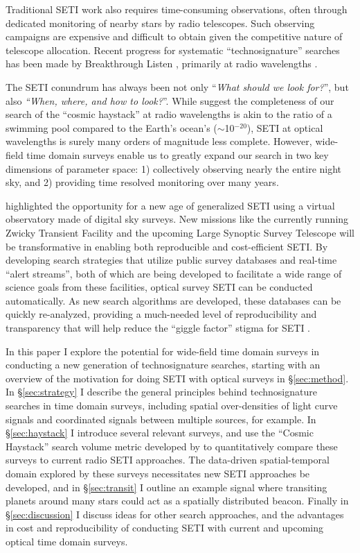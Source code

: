 \documentclass[twocolumn]{aastex62}
\begin{document}
Traditional SETI work also requires time-consuming observations, often through dedicated monitoring of nearby stars by radio telescopes. Such observing campaigns are expensive and difficult to obtain given the competitive nature of telescope allocation. Recent progress for systematic ``technosignature'' searches has been made by Breakthrough Listen \citep{worden2017,isaacson2017}, primarily at radio wavelengths \citep[e.g.][]{price2018}. 


The SETI conundrum has always been not only ``{\it What should we look for?}'', but  also {\it ``When, where, and how to look?}''. 
While \citet{wright2018c} suggest the completeness of our search of the ``cosmic haystack'' at radio wavelengths is akin to the ratio of a swimming pool compared to the Earth's ocean's ($\sim$10$^{-20}$), SETI at optical wavelengths is surely many orders of magnitude less complete. However, wide-field time domain surveys enable us to greatly expand our search in two key dimensions of parameter space: 1) collectively observing nearly the entire night sky, and 2) providing time resolved monitoring over many years. 


\citet{djorgovski2000} highlighted the opportunity for a new age of generalized SETI using a virtual observatory made of digital sky surveys.
New missions like the currently running Zwicky Transient Facility \citep[ZTF][]{bellm2014} and the upcoming Large Synoptic Survey Telescope \citep[LSST][]{lsst} will be transformative in enabling both reproducible and cost-efficient SETI. By developing search strategies that utilize public survey databases and real-time ``alert streams'', both of which are being developed to facilitate a wide range of science goals from these facilities, optical survey SETI can be conducted automatically. As new search algorithms are developed, these databases can be quickly re-analyzed, providing a much-needed level of reproducibility and transparency that will help reduce the ``giggle factor'' stigma for SETI \citep{wright2018b}.


In this paper I explore the potential for wide-field time domain surveys in conducting a new generation of technosignature searches, starting with an overview of the motivation for doing SETI with optical surveys in \S\ref{sec:method}.
In \S\ref{sec:strategy} I describe the general principles behind technosignature searches in time domain surveys, including spatial over-densities of light curve signals and coordinated signals between multiple sources, for example.
In \S\ref{sec:haystack} I introduce several relevant surveys, and use the ``Cosmic Haystack'' search volume metric developed by \citet{wright2018c} to quantitatively compare these surveys to current radio SETI approaches. 
The data-driven spatial-temporal domain explored by these surveys necessitates new SETI approaches be developed, and in \S\ref{sec:transit} I outline an example signal where transiting planets around many stars could act as a spatially distributed beacon.
Finally in \S\ref{sec:discussion} I discuss ideas for other search approaches, and the advantages in cost and reproducibility of conducting SETI with current and upcoming optical time domain surveys.
\end{document}
